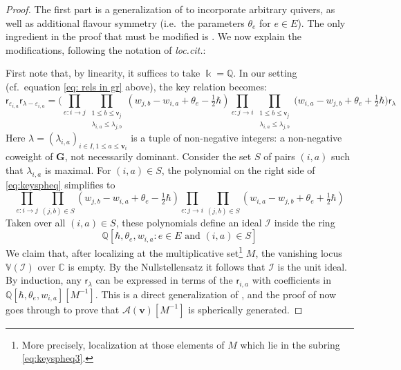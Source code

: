 \documentclass[11pt,reqno]{amsart}
\renewcommand{\mathbf}{\mathbold}
\numberwithin{equation}{section}
\theoremstyle{definition}
\newcommand{\cA}{\mathcal{A}}
\newcommand{\bG}{\mathbf{G}}
\newcommand{\bv}{\mathbf{v}}
\newcommand{\CC}{\mathbb{C}}
\newcommand{\QQ}{\mathbb{Q}}
\newcommand{\eps}{\varepsilon}
\newcommand{\kk}{\Bbbk}
\renewcommand{\bv}{\mathbf{v}} %
\newcommand{\sv}{\mathsf{v}}
\newcommand{\sfr}{{\mathsf{r}}}
\newcommand{\vertexset}{I}
\newcommand{\arrowset}{E}
\newcommand{\qzast}{\cA}
\begin{document}
\begin{proof}
    The first part is a generalization of \cite[Theorem 3.7]{Weekes} to incorporate arbitrary quivers, as well as  additional flavour symmetry (i.e.~the parameters $\theta_e$ for $e \in \arrowset$). The only ingredient in the proof that must be modified is \cite[Proposition 3.5]{Weekes}. We now explain the modifications,  following the notation of \emph{loc.cit.}:
    
    First note that, by linearity, it suffices to take $\kk = \QQ$.  In our setting (cf.~equation \eqref{eq: rels in gr} above), the key relation \cite[equation (21)]{Weekes} becomes:
    \begin{equation}
        \label{eq:keyspheq}
        \sfr_{\eps_{i,a}} \sfr_{\lambda-\eps_{i,a}} = \Bigg( \prod_{e:i\rightarrow j}\prod_{\substack{1 \leq b \leq \sv_j \\ \lambda_{i,a} \leq \lambda_{j,b}}} (w_{j,b} - w_{i,a} + \theta_e -\tfrac{1}{2}\hbar) \prod_{e: j \rightarrow i} \prod_{\substack{1 \leq b \leq \sv_j \\ \lambda_{i,a} \leq \lambda_{j,b}}}(w_{i,a} -w_{j,b} + \theta_e +\tfrac{1}{2}\hbar\Bigg) \sfr_\lambda
    \end{equation}
    Here $\lambda = (\lambda_{i,a})_{i \in \vertexset, 1 \leq a \leq \bv_i}$ is a tuple of non-negative integers:  a non-negative coweight of $\bG$, not necessarily dominant. Consider the set $S$ of pairs $(i,a)$ such that $\lambda_{i,a}$ is maximal. For $(i,a) \in S$, the polynomial on the right side of \eqref{eq:keyspheq} simplifies to
    \begin{equation}
        \label{eq:keyspheq2}
        \prod_{e : i \rightarrow j} \prod_{(j,b) \in S} (w_{j,b} - w_{i,a} + \theta_e - \tfrac{1}{2}\hbar) \prod_{e : j \rightarrow i} \prod_{(j,b) \in S} (w_{i,a} - w_{j,b} + \theta_e + \tfrac{1}{2}\hbar)
    \end{equation}
    Taken over all $(i,a) \in S$,  these polynomials define an ideal $\mathcal{I}$ inside the ring 
    \begin{equation}
        \label{eq:keyspheq3}
        \QQ[\hbar, \theta_e, w_{i,a} : e \in \arrowset \text{ and } (i,a) \in S]        
    \end{equation}
    We claim that, after localizing at the multiplicative set\footnote{More precisely, localization at those elements  of $M$ which lie in the subring \eqref{eq:keyspheq3}.} $M$, the vanishing locus $\mathbb{V}(\mathcal{I})$ over $\CC$ is  empty. By the Nullstellensatz it follows that $\mathcal{I}$ is the unit ideal. By induction, any $\sfr_\lambda$ can be expressed in terms of the $\sfr_{i,a}$ with coefficients in $\QQ[\hbar, \theta_e, w_{i,a}][M^{-1}]$. This is a direct generalization of \cite[Proposition 3.5]{Weekes}, and the proof of \cite[Theorem 3.7]{Weekes} now goes through to prove that $\qzast(\bv)[M^{-1}]$ is spherically generated.


\end{proof}
\end{document}
